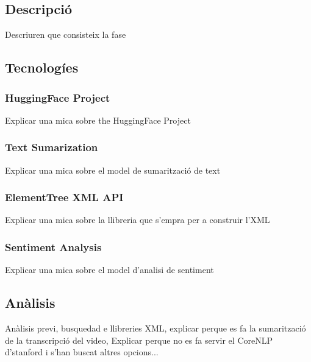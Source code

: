 
\subsection{Descripció}
Descriuren que consisteix la fase
\subsection{Tecnologíes}
\subsubsection{HuggingFace Project}
Explicar una mica sobre the HuggingFace Project
\subsubsection{Text Sumarization}
Explicar una mica sobre el model de sumarització de text
\subsubsection{ElementTree XML API}
Explicar una mica sobre la llibreria que s'empra per a construir l'XML
\subsubsection{Sentiment Analysis}
Explicar una mica sobre el model d'analisi de sentiment
\subsection{Anàlisis}
Anàlisis previ, busquedad e llibreries XML, explicar perque es fa la sumarització de la transcripció del video, Explicar perque no es fa servir el CoreNLP d'stanford i s'han buscat altres opcions...
